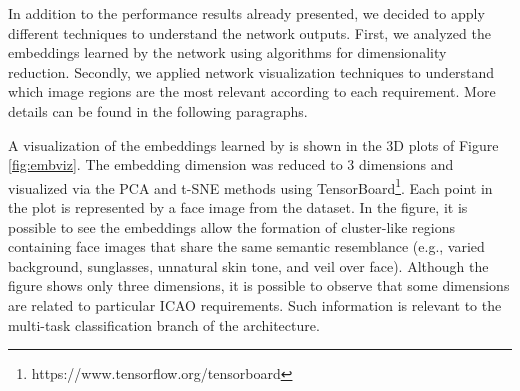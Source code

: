 In addition to the performance results already presented, we decided to apply different techniques to understand the network outputs. First, we analyzed the embeddings learned by the network using algorithms for dimensionality reduction. Secondly, we applied network visualization techniques to understand which image regions are the most relevant according to each requirement. More details can be found in the following paragraphs.

A visualization of the embeddings learned by \methodname is shown in the 3D plots of Figure \ref{fig:embviz}. The embedding dimension was reduced to 3 dimensions and visualized via the PCA \citep{pca} and t-SNE \citep{tsne} methods using TensorBoard\footnote{https://www.tensorflow.org/tensorboard}. Each point in the plot is represented by a face image from the dataset. In the figure, it is possible to see the embeddings allow the formation of cluster-like regions containing face images that share the same semantic resemblance (e.g., varied background, sunglasses, unnatural skin tone, and veil over face). Although the figure shows only three dimensions, it is possible to observe that some dimensions are related to particular ICAO requirements. Such information is relevant to the multi-task classification branch of the \methodname architecture. 

